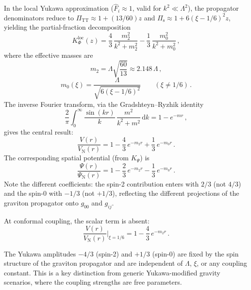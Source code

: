 \documentclass[aps,prd,twocolumn,superscriptaddress,nofootinbib,floatfix]{revtex4-2}
\newcommand{\dd}{\mathrm{d}}
\newcommand{\PiTT}{\Pi_{\mathrm{TT}}}
\newcommand{\Pis}{\Pi_{\mathrm{s}}}
\begin{document}
In the local Yukawa approximation
($\hat{F}_i \approx 1$, valid for $k^2 \ll \Lambda^2$), the propagator
denominators reduce to $\PiTT \approx 1 + (13/60)z$ and
$\Pis \approx 1 + 6(\xi-1/6)^2 z$, yielding the partial-fraction
decomposition
\begin{equation}
  K_\Phi^{\mathrm{loc}}(z) = \frac{4}{3}\,\frac{m_2^2}{k^2+m_2^2}
  - \frac{1}{3}\,\frac{m_0^2}{k^2+m_0^2}\,,
\end{equation}
where the effective masses are
\begin{equation}
  m_2 = \Lambda\sqrt{\frac{60}{13}} \approx 2.148\,\Lambda\,,
  \label{eq:m2}
\end{equation}
\begin{equation}
  m_0(\xi) = \frac{\Lambda}{\sqrt{6(\xi - 1/6)^2}}
  \qquad (\xi \neq 1/6)\,.
  \label{eq:m0}
\end{equation}
The inverse Fourier transform, via the Gradshteyn--Ryzhik identity
\begin{equation}
  \frac{2}{\pi}\int_0^\infty
  \frac{\sin(kr)}{k}\,\frac{m^2}{k^2+m^2}\,\dd k
  = 1 - e^{-mr}\,,
\end{equation}
gives the central result:
\begin{equation}
  \boxed{
    \frac{V(r)}{V_{\mathrm{N}}(r)}
    = 1 - \frac{4}{3}\,e^{-m_2 r} + \frac{1}{3}\,e^{-m_0 r}\,.}
  \label{eq:V}
\end{equation}
The corresponding spatial potential (from $K_\Psi$) is
\begin{equation}
  \frac{\Psi(r)}{\Psi_{\mathrm{N}}(r)}
  = 1 - \frac{2}{3}\,e^{-m_2 r} - \frac{1}{3}\,e^{-m_0 r}\,.
  \label{eq:Psi}
\end{equation}
Note the different coefficients: the spin-2 contribution enters with
$2/3$ (not $4/3$) and the spin-0 with $-1/3$ (not $+1/3$), reflecting
the different projections of the graviton propagator onto $g_{00}$ and
$g_{ij}$.

At conformal coupling, the scalar term is absent:
\begin{equation}
  \frac{V(r)}{V_{\mathrm{N}}(r)}\bigg|_{\xi=1/6}
  = 1 - \frac{4}{3}\,e^{-m_2 r}\,.
  \label{eq:V-conformal}
\end{equation}

The Yukawa amplitudes $-4/3$ (spin-2) and $+1/3$ (spin-0) are
fixed by the spin structure of the
graviton propagator and are independent of $\Lambda$, $\xi$, or any
coupling constant. This is a key distinction from generic Yukawa-modified
gravity scenarios, where the coupling strengths are free parameters.
\end{document}
